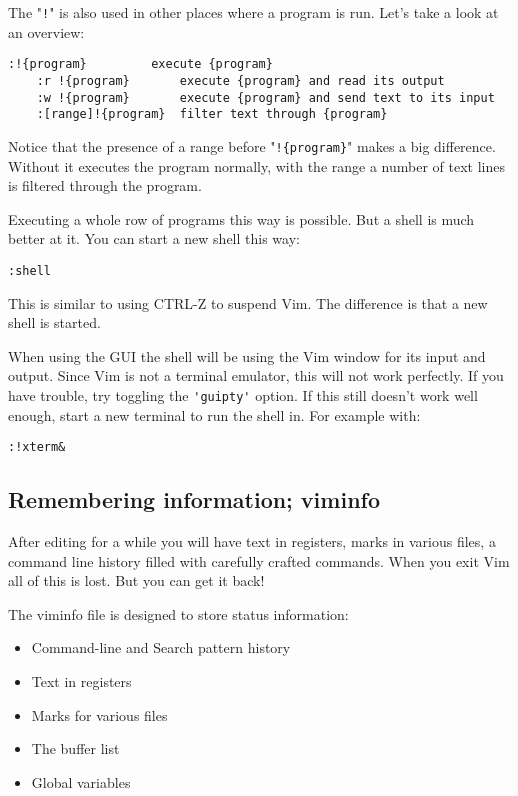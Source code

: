 The "\verb:!:" is also used in other places where a program is run.
Let's take a look at an overview:

\begin{Verbatim}[samepage=true]
    :!{program}     	execute {program}
    :r !{program}      	execute {program} and read its output
    :w !{program}     	execute {program} and send text to its input
    :[range]!{program}  filter text through {program}
\end{Verbatim}

Notice that the presence of a range before "\verb:!{program}:" makes a big difference.
Without it executes the program normally, with the range a number of text lines is filtered through the program.

Executing a whole row of programs this way is possible.
But a shell is much better at it.
You can start a new shell this way:

\begin{Verbatim}[samepage=true]
 :shell
\end{Verbatim}

This is similar to using CTRL-Z to suspend Vim.
The difference is that a new shell is started.

When using the GUI the shell will be using the Vim window for its input and output.
Since Vim is not a terminal emulator, this will not work perfectly.
If you have trouble, try toggling the \verb!'guipty'! option.
If this still doesn't work well enough, start a new terminal to run the shell in.
For example with:

\begin{Verbatim}[samepage=true]
 :!xterm&
\end{Verbatim}
\subsection{Remembering information; viminfo}
After editing for a while you will have text in registers, marks in various files, a command line history filled with carefully crafted commands.
When you exit Vim all of this is lost.
But you can get it back!

The viminfo file is designed to store status information:
\begin{itemize}
\item Command-line and Search pattern history
\item Text in registers
\item Marks for various files
\item The buffer list
\item Global variables
\end{itemize}

